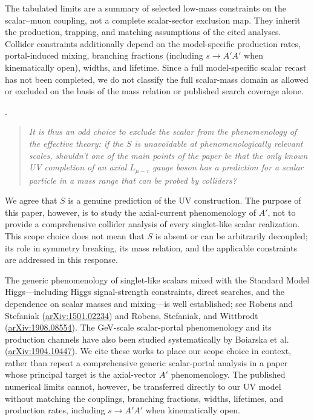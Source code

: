 \documentclass[12pt,a4paper]{article}
\begin{document}
The tabulated limits are a summary of selected low-mass constraints on the scalar--muon coupling, not a complete scalar-sector exclusion map. They inherit the production, trapping, and matching assumptions of the cited analyses. Collider constraints additionally depend on the model-specific production rates, portal-induced mixing, branching fractions (including \(s\to A'A'\) when kinematically open), widths, and lifetime. Since a full model-specific scalar recast has not been completed, we do not classify the full scalar-mass domain as allowed or excluded on the basis of the mass relation or published search coverage alone.

\medskip
{}. \begin{quote}\itshape
It is thus an odd choice to exclude the scalar from the phenomenology of the effective theory: if the \(S\) is unavoidable at phenomenologically relevant scales, shouldn't one of the main points of the paper be that the only known UV completion of an axial \(L_{\mu-\tau}\) gauge boson has a prediction for a scalar particle in a mass range that can be probed by colliders?\end{quote}

We agree that \(S\) is a genuine prediction of the UV construction. The purpose of this paper, however, is to study the axial-current phenomenology of \(A'\), not to provide a comprehensive collider analysis of every singlet-like scalar realization. This scope choice does not mean that \(S\) is absent or can be arbitrarily decoupled; its role in symmetry breaking, its mass relation, and the applicable constraints are addressed in this response.

The generic phenomenology of singlet-like scalars mixed with the Standard Model Higgs—including Higgs signal-strength constraints, direct searches, and the dependence on scalar masses and mixing—is well established; see Robens and Stefaniak (\href{https://arxiv.org/abs/1501.02234}{arXiv:1501.02234}) and Robens, Stefaniak, and Wittbrodt (\href{https://arxiv.org/abs/1908.08554}{arXiv:1908.08554}). The GeV-scale scalar-portal phenomenology and its production channels have also been studied systematically by Boiarska et al. (\href{https://arxiv.org/abs/1904.10447}{arXiv:1904.10447}). We cite these works to place our scope choice in context, rather than repeat a comprehensive generic scalar-portal analysis in a paper whose principal target is the axial-vector \(A'\) phenomenology. The published numerical limits cannot, however, be transferred directly to our UV model without matching the couplings, branching fractions, widths, lifetimes, and production rates, including \(s\to A'A'\) when kinematically open.
\end{document}
